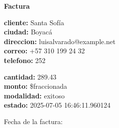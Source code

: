 \documentclass{article}
\begin{document}
\begin{center}
    {\LARGE \textbf{Factura}}\\[1cm]
\end{center}

\textbf{cliente:} Santa Sofía \\
\textbf{ciudad:} Boyacá \\
\textbf{direccion:} luisalvarado@example.net \\
\textbf{correo:} +57 310 199 24 32 \\
\textbf{telefono:} 252 \\

\vspace{0.5cm}

\textbf{cantidad:} 289.43 \\
\textbf{monto:} \$fraccionada \\
\textbf{modalidad:} exitoso \\
\textbf{estado:} 2025-07-05 16:46:11.960124 \\

\vspace{1cm}

Fecha de la factura: 
\end{document}
